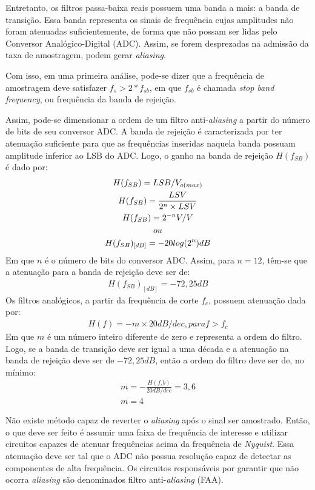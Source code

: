 \documentclass[
	12pt,				%
	openright,			%
	twoside,			%
	a4paper,			%
	english,			%
	french,				%
	spanish,			%
	brazil,				%
	]{abntex2}
\begin{document}
		Entretanto, os filtros passa-baixa reais possuem uma banda a
		mais: a banda de transição. Essa banda representa os sinais de
		frequência cujas amplitudes não foram atenuadas suficientemente,
		de forma que não possam ser lidas pelo Conversor Analógico-Digital
		(ADC). Assim, se forem desprezadas na admissão da taxa de amostragem,
		podem gerar \textit{aliasing}.

		Com isso, em uma primeira análise, pode-se dizer que a frequência de
		amostragem deve satisfazer $f_s>2*f_{sb}$, em que $f_{sb}$ é chamada
		\textit{stop band frequency}, ou frequência da banda de rejeição.

		Assim, pode-se dimensionar a ordem de um filtro anti-\textit{aliasing} a partir do número de bits de seu conversor ADC. A banda de rejeição é caracterizada por ter atenuação
		suficiente para que as frequências inseridas naquela banda possuam amplitude
		inferior ao LSB do ADC. Logo, o ganho na banda de rejeição $H(f_{SB})$ é
		dado por:
		\begin{gather*}
			H(f_{SB}) = LSB/V_{o(max)}\\
			H(f_{SB}) = \frac{LSV}{2^n\times LSV}\\
			H(f_{SB}) = 2^{-n}V/V\\
			ou\\
			H(f_{SB})_{[dB]} = -20\*log(2^n) dB
		\end{gather*}
		Em que $n$ é o número de bits do conversor ADC. Assim, para $n=12$, têm-se que a atenuação para a banda de rejeição deve ser de:
		\begin{gather*}
			H(f_{SB})_{[dB]} = -72,25 dB
		\end{gather*}
		Os filtros analógicos, a partir da frequência de corte $f_c$, possuem atenuação dada por:
		\begin{gather*}
			H(f) = -m\times 20 dB/dec, para f>f_c
		\end{gather*}
		Em que $m$ é um número inteiro diferente de zero e representa a ordem do filtro. Logo, se a banda de transição deve ser igual a uma década e a atenuação na banda de rejeição deve ser de $-72,25 dB$, então a ordem do filtro deve ser de, no mínimo:
		\begin{gather*}
			m = -\frac{H(f_sb)}{20 dB/dec} = 3,6\\
			m = 4
		\end{gather*}

		Não existe método capaz de reverter o \textit{aliasing} após o
		sinal ser amostrado. Então, o que deve ser feito é assumir uma
		faixa de frequência de interesse e utilizar circuitos capazes de
		atenuar frequências acima da frequência de \textit{Nyquist}.
		Essa atenuação deve ser tal que o ADC não possua resolução capaz
		de detectar as componentes de alta frequência. Os circuitos
		responsáveis por garantir que não ocorra \textit{aliasing} são
		denominados filtro anti-\textit{aliasing} (FAA).
\end{document}
